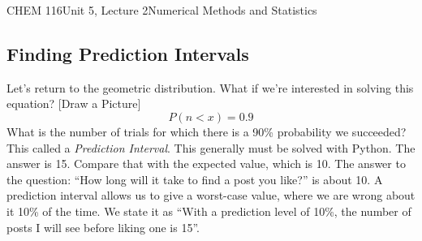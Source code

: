 \documentclass{article}
\begin{document}
\begin{tdoc}{CHEM 116}{Unit 5, Lecture 2}{Numerical Methods and Statistics}
\subsection{Finding Prediction Intervals}

Let's return to the geometric distribution. What if we're interested
in solving this equation? [Draw a Picture]
\[
P(n < x) = 0.9
\]
What is the number of trials for which there is a 90\% probability we
succeeded? This called a \emph{Prediction Interval}. This generally
must be solved with Python. The answer is 15. Compare that with the
expected value, which is 10. The answer to the question: ``How long
will it take to find a post you like?'' is about 10. A prediction
interval allows us to give a worst-case value, where we are wrong
about it 10\% of the time. We state it as ``With a prediction level of
10\%, the number of posts I will see before liking one is 15''.


\end{tdoc}
\end{document}

